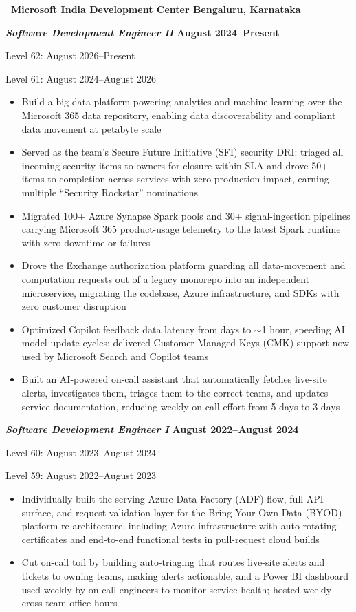 \textbf{\faMicrosoft\ Microsoft India Development Center \hfill Bengaluru, Karnataka}\par
\textit{\textbf{Software Development Engineer II}} \hfill \textbf{August 2024--Present}\par
{\small Level 62: August 2026--Present\par}
{\small Level 61: August 2024--August 2026\par}
\begin{itemize}
	\item Build a big-data platform powering analytics and machine learning over the Microsoft 365 data repository, enabling data discoverability and compliant data movement at petabyte scale
	\item Served as the team's Secure Future Initiative (SFI) security DRI: triaged all incoming security items to owners for closure within SLA and drove 50+ items to completion across services with zero production impact, earning multiple ``Security Rockstar'' nominations
	\item Migrated 100+ Azure Synapse Spark pools and 30+ signal-ingestion pipelines carrying Microsoft 365 product-usage telemetry to the latest Spark runtime with zero downtime or failures
	\item Drove the Exchange authorization platform guarding all data-movement and computation requests out of a legacy monorepo into an independent microservice, migrating the codebase, Azure infrastructure, and SDKs with zero customer disruption
	\item Optimized Copilot feedback data latency from days to $\sim$1 hour, speeding AI model update cycles; delivered Customer Managed Keys (CMK) support now used by Microsoft Search and Copilot teams
	\item Built an AI-powered on-call assistant that automatically fetches live-site alerts, investigates them, triages them to the correct teams, and updates service documentation, reducing weekly on-call effort from 5 days to 3 days
\end{itemize}\par
\textit{\textbf{Software Development Engineer I}} \hfill \textbf{August 2022--August 2024}\par
{\small Level 60: August 2023--August 2024\par}
{\small Level 59: August 2022--August 2023\par}
\begin{itemize}
	\item Individually built the serving Azure Data Factory (ADF) flow, full API surface, and request-validation layer for the Bring Your Own Data (BYOD) platform re-architecture, including Azure infrastructure with auto-rotating certificates and end-to-end functional tests in pull-request cloud builds
	\item Cut on-call toil by building auto-triaging that routes live-site alerts and tickets to owning teams, making alerts actionable, and a Power BI dashboard used weekly by on-call engineers to monitor service health; hosted weekly cross-team office hours
\end{itemize}\par
